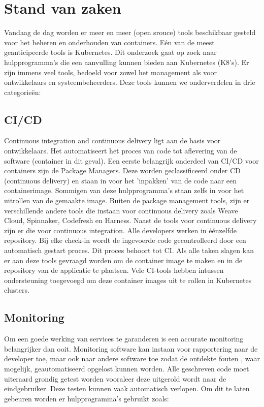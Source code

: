 \section{Stand van zaken}
\label{sec:state-of-the-art}

Vandaag de dag worden er meer en meer (open srouce) tools beschikbaar gesteld voor het beheren en onderhouden van containers. Eén van de meest geanticipeerde tools is Kubernetes. Dit onderzoek gaat op zoek naar hulpprogramma's die een aanvulling kunnen bieden aan Kubernetes (K8's). Er zijn immens veel tools, bedoeld voor zowel het management als voor ontwikkelaars en systeembeheerders. Deze tools kunnen we onderverdelen in drie categorieën:

\subsection{CI/CD}
Continuous integration and continuous delivery ligt aan de basis voor ontwikkelaars. Het automatiseert het proces van code tot aflevering van de software (container in dit geval). Een eerste belangrijk onderdeel van CI/CD voor containers zijn de Package Managers. Deze worden geclassificeerd onder CD (continuous delivery) en staan in voor het 'inpakken' van de code naar een containerimage. Sommigen van deze hulpprogramma's staan zelfs in voor het uitrollen van de gemaakte image.\autocite{Anita,2018a}
Buiten de package management tools, zijn er verschillende andere tools die instaan voor continuous delivery zoals Weave Cloud, Spinnaker, Codefresh en Harness. Naast de tools voor continuous delivery zijn er die voor continuous integration. Alle developers werken in éénzelfde repository. Bij elke check-in wordt de ingevoerde code gecontrolleerd door een automatisch gestart proces. Dit proces behoort tot CI. Als alle taken slagen kan er aan deze tools gevraagd worden om de container image te maken en in de repository van de applicatie te plaatsen. Vele CI-tools hebben intussen ondersteuning toegevoegd om deze container images uit te rollen in Kubernetes clusters.
\subsection{Monitoring}
Om een goede werking van services te garanderen is een accurate monitoring belangrijker dan ooit. Monitoring software kan instaan voor rapportering naar de developer toe, maar ook naar andere software toe zodat de ontdekte fouten , waar mogelijk, geautomatiseerd opgelost kunnen worden.\autocite{Buehrle2018pt2}
Alle geschreven code moet uiteraard grondig getest worden vooraleer deze uitgerold wordt naar de eindgebruiker. Deze testen kunnen vaak automatisch verlopen. Om dit te laten gebeuren worden er hulpprogramma's gebruikt zoals:
